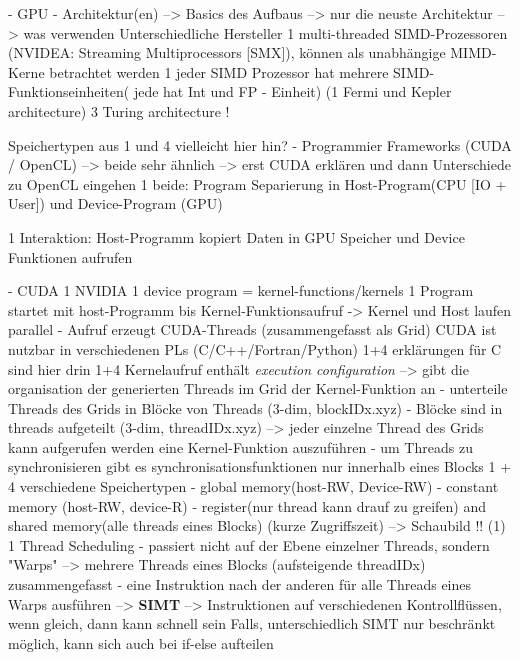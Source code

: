 \documentclass[a4paper,12pt]{llncs}
\numberwithin{equation}{section}
\begin{document}
- GPU - Architektur(en)
    --> Basics des Aufbaus
    --> nur die neuste Architektur
    --> was verwenden Unterschiedliche Hersteller
    1 multi-threaded SIMD-Prozessoren (NVIDEA: Streaming Multiprocessors [SMX]), können als unabhängige MIMD-Kerne betrachtet werden
    1 jeder SIMD Prozessor hat mehrere SIMD-Funktionseinheiten( jede hat Int und FP - Einheit)
    (1 Fermi und Kepler architecture)
    3 Turing architecture !
    
    Speichertypen aus 1 und 4 vielleicht hier hin?
  - Programmier Frameworks (CUDA / OpenCL)	
    --> beide sehr ähnlich --> erst CUDA erklären und dann Unterschiede zu OpenCL eingehen
    1 beide: Program Separierung in Host-Program(CPU [IO + User]) und Device-Program (GPU)

    
    1 Interaktion: Host-Programm kopiert Daten in GPU Speicher und Device Funktionen aufrufen
    
    - CUDA
      1 NVIDIA
      1 device program = kernel-functions/kernels
      1 Program startet mit host-Programm bis Kernel-Funktionsaufruf -> Kernel und Host laufen parallel
      	- Aufruf erzeugt CUDA-Threads (zusammengefasst als Grid)
      CUDA ist nutzbar in verschiedenen PLs (C/C++/Fortran/Python)
      1+4 erklärungen für C sind hier drin
	  1+4 Kernelaufruf enthält \textit{execution configuration}
	  	--> gibt die organisation der generierten Threads im Grid der Kernel-Funktion an
	  	  - unterteile Threads des Grids in Blöcke von Threads (3-dim, blockIDx.xyz)
	  	  - Blöcke sind in threads aufgeteilt (3-dim, threadIDx.xyz)
	   --> jeder einzelne Thread des Grids kann aufgerufen werden eine Kernel-Funktion auszuführen      
          - um Threads zu synchronisieren gibt es synchronisationsfunktionen nur innerhalb eines Blocks
      1 + 4 verschiedene Speichertypen
        - global memory(host-RW, Device-RW)
        - constant memory (host-RW, device-R)
        - register(nur thread kann drauf zu greifen) and shared memory(alle threads eines Blocks) (kurze Zugriffszeit)
        --> Schaubild !! (1)
      1 Thread Scheduling
        - passiert nicht auf der Ebene einzelner Threads, sondern "Warps" --> mehrere Threads eines Blocks (aufsteigende threadIDx) zusammengefasst
        - eine Instruktion nach der anderen für alle Threads eines Warps ausführen --> \textbf{SIMT}
          --> Instruktionen auf verschiedenen Kontrollflüssen, wenn gleich, dann kann schnell sein
          	Falls, unterschiedlich SIMT nur beschränkt möglich, kann sich auch bei if-else aufteilen
        
\end{document}
